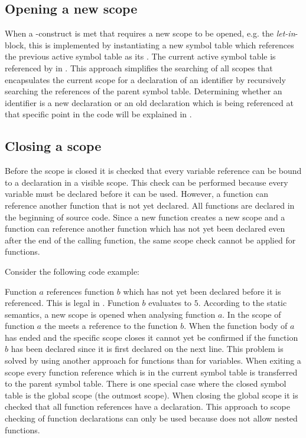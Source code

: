 \subsection{Opening a new scope}
When a \productname{}-construct is met that requires a new scope to be opened, e.g. the \emph{let-in}-block, this is implemented by instantiating a new symbol table which references the previous active symbol table as its  . The current active symbol table is referenced by   in . This approach simplifies the searching of all scopes that encapsulates the current scope for a declaration of an identifier by recursively searching the references of the parent symbol table. Determining whether an identifier is a new declaration or an old declaration which is being referenced at that specific point in the code will be explained in .

\subsection{Closing a scope}
\label{sec:closescope}
Before the scope is closed it is checked that every variable reference can be bound to a declaration in a visible scope.
This check can be performed because every variable must be declared before it can be used. 
However, a function can reference another function that is not yet declared. 
All functions are declared in the beginning of \productname{} source code.
Since a new function creates a new scope and a function can reference another function which has not yet been declared even after the end of the calling function, the same scope check cannot be applied for functions.

Consider the following \productname{} code example:


Function $a$ references function $b$ which has not yet been declared before it is referenced. 
This is legal in \productname{}.
Function $b$ evaluates to $5$. 
According to the static semantics, a new scope is opened when analysing function $a$. 
In the scope of function $a$ the  meets a reference to the function $b$.
When the function body of $a$ has ended and the specific scope closes it cannot yet be confirmed if the function $b$ has been declared since it is first declared on the next line.
This problem is solved by using another approach for functions than for variables. 
When exiting a scope every function reference which is in the current symbol table is transferred to the parent symbol table. There is one special case where the closed symbol table is the global scope (the outmost scope). 
When closing the global scope it is checked that all function references have a declaration.
This approach to scope checking of function declarations can only be used because \productname{} does not allow nested functions.

